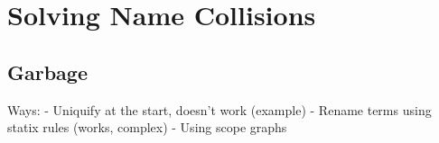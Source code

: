 
\chapter{\label{chap:namecolls}Solving Name Collisions}






\section{Garbage}

Ways:
- Uniquify at the start, doesn't work (example)
- Rename terms using statix rules (works, complex)
- Using scope graphs